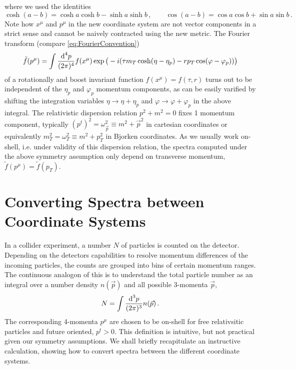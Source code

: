 where we used the identities
\begin{equation}
    \cosh(a-b)=\cosh a\cosh b-\sinh a\sinh b\,,\qquad\cos(a-b)=\cos a\cos b+\sin a\sin b\,.
\end{equation}
Note how $x^\mu$ and $p^\mu$ in the new coordinate system are not vector components in a strict sense and cannot be naively contracted using the new metric. The Fourier transform (compare \eqref{eq:FourierConvention})
\begin{equation}
    \tilde{f}(p^\mu)=\int\frac{\text{d}^4p}{(2\pi)^4}f(x^\mu)\exp\big(-{i}(\tau m_T\cosh(\eta-\eta_p)-rp_T\cos(\varphi-\varphi_p))\big)
\end{equation}
of a rotationally and boost invariant function ${f(x^\mu)=f(\tau,r)}$ turns out to be independent of the $\eta_p$ and $\varphi_p$ momentum components, as can be easily varified by shifting the integration variables ${\eta\to\eta+\eta_p}$ and ${\varphi\to\varphi+\varphi_p}$ in the above integral. The relativistic dispersion relation ${p^2+m^2=0}$ fixes 1 momentum component, typically ${(p^t)^2=\omega_{\vec{p}}^2\equiv m^2+\vec{p}^2}$ in cartesian coordinates or equivalently ${m_T^2=\omega_T^2\equiv m^2+p_T^2}$ in Bjorken coordinates. As we usually work on-shell, i.e. under validity of this dispersion relation, the spectra computed under the above symmetry assumption only depend on transverse momentum, ${\tilde{f}(p^\mu)=\tilde{f}(p_T)}$.



\section{Converting Spectra between Coordinate Systems}
\label{sec:SpectraCoordinateSystem}

In a collider experiment, a number $N$ of particles is counted on the detector. Depending on the detectors capabilities to resolve momentum differences of the incoming particles, the counts are grouped into bins of certain momentum ranges. The continuous analogon of this is to understand the total particle number as an integral over a number density $n(\vec{p})$ and all possible 3-momenta $\vec{p}$,
\begin{equation}
    N=\int\frac{\text{d}^3p}{(2\pi)^3}n(\vec{p})\,.
    \label{eq:NumberDensity_Cartesian}
\end{equation}
The corresponding 4-momenta $p^\mu$ are chosen to be on-shell for free relativsitic particles and future oriented, $p^t>0$. This definition is intuitive, but not practical given our symmetry assumptions. We shall briefly recapitulate an instructive calculation, showing how to convert spectra between the different coordinate systems.

